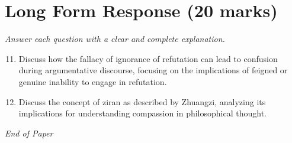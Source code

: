 \documentclass[12pt]{article}
\begin{document}
\section*{Long Form Response (20 marks)}
\textit{Answer each question with a clear and complete explanation.}
\begin{enumerate}[label=\arabic*.]
\setcounter{enumi}{10}
\item Discuss how the fallacy of ignorance of refutation can lead to confusion during argumentative discourse, focusing on the implications of feigned or genuine inability to engage in refutation.
\item Discuss the concept of ziran as described by Zhuangzi, analyzing its implications for understanding compassion in philosophical thought.
\end{enumerate}

\vfill
\noindent\textit{End of Paper}
\end{document}
